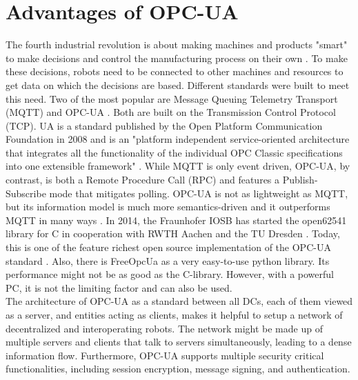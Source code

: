 \documentclass[conference]{IEEEtran}
\begin{document}
\section{Advantages of OPC-UA}
The fourth industrial revolution is about making machines and products "smart" to make decisions and control the manufacturing process on their own \cite{Industry4}.
To make these decisions, robots need to be connected to other machines and resources to get data on which the decisions are based.
Different standards were built to meet this need. Two of the most popular are Message Queuing Telemetry Transport (MQTT) and OPC-UA \cite{CommTechnology}.
Both are built on the Transmission Control Protocol (TCP).
UA is a standard published by the Open Platform Communication Foundation in 2008 and is an "platform independent service-oriented architecture that integrates all the functionality of the individual OPC Classic specifications into one extensible framework" \cite{OPCUA}.
While MQTT is only event driven, OPC-UA, by contrast, is both a Remote Procedure Call (RPC) and features a Publish-Subscribe mode \cite{OPCUA} that mitigates polling. 
OPC-UA is not as lightweight as MQTT, but its information model is much more semantics-driven and it outperforms MQTT in many ways \cite{CommunicationCommarison}.
In 2014, the Fraunhofer IOSB has started the open62541 library for C in cooperation with RWTH Aachen and the TU Dresden \cite{open62541}.
Today, this is one of the feature richest open source implementation of the OPC-UA standard \cite{ComparOPCUAPaper}.
Also, there is FreeOpcUa as a very easy-to-use python library.
Its performance might not be as good as the C-library. However, with a powerful PC, it is not the limiting factor and can also be used.\\
The architecture of OPC-UA as a standard between all DCs, each of them viewed as a server, and entities acting as clients,  makes it helpful to setup a network of decentralized and interoperating robots.
The network might be made up of multiple servers and clients that  talk to servers simultaneously, leading to a dense information flow. Furthermore, OPC-UA supports  multiple security critical functionalities, including session encryption, message signing, and authentication. \cite{OPCUA}
\end{document}
